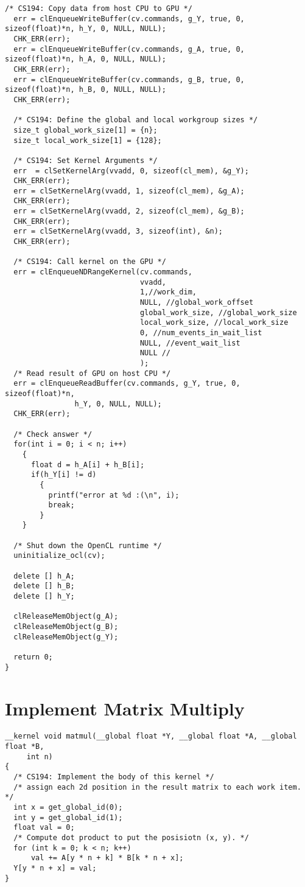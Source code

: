 \documentclass[11pt,letter]{article}
\begin{document}
\begin{lstlisting}[label=some-code,caption=vvadd.cpp]
  /* CS194: Copy data from host CPU to GPU */
  err = clEnqueueWriteBuffer(cv.commands, g_Y, true, 0, sizeof(float)*n, h_Y, 0, NULL, NULL);
  CHK_ERR(err);
  err = clEnqueueWriteBuffer(cv.commands, g_A, true, 0, sizeof(float)*n, h_A, 0, NULL, NULL);
  CHK_ERR(err);
  err = clEnqueueWriteBuffer(cv.commands, g_B, true, 0, sizeof(float)*n, h_B, 0, NULL, NULL);
  CHK_ERR(err);
 
  /* CS194: Define the global and local workgroup sizes */
  size_t global_work_size[1] = {n};
  size_t local_work_size[1] = {128};
  
  /* CS194: Set Kernel Arguments */
  err  = clSetKernelArg(vvadd, 0, sizeof(cl_mem), &g_Y);
  CHK_ERR(err);
  err = clSetKernelArg(vvadd, 1, sizeof(cl_mem), &g_A);
  CHK_ERR(err);
  err = clSetKernelArg(vvadd, 2, sizeof(cl_mem), &g_B);
  CHK_ERR(err);
  err = clSetKernelArg(vvadd, 3, sizeof(int), &n);
  CHK_ERR(err);

  /* CS194: Call kernel on the GPU */
  err = clEnqueueNDRangeKernel(cv.commands,
                               vvadd,
                               1,//work_dim,
                               NULL, //global_work_offset
                               global_work_size, //global_work_size
                               local_work_size, //local_work_size
                               0, //num_events_in_wait_list
                               NULL, //event_wait_list
                               NULL //
                               );
  /* Read result of GPU on host CPU */
  err = clEnqueueReadBuffer(cv.commands, g_Y, true, 0, sizeof(float)*n,
			    h_Y, 0, NULL, NULL);
  CHK_ERR(err);

  /* Check answer */
  for(int i = 0; i < n; i++)
    {
      float d = h_A[i] + h_B[i];
      if(h_Y[i] != d)
    	{
    	  printf("error at %d :(\n", i);
    	  break;
    	}
    }

  /* Shut down the OpenCL runtime */
  uninitialize_ocl(cv);
  
  delete [] h_A; 
  delete [] h_B; 
  delete [] h_Y;
  
  clReleaseMemObject(g_A); 
  clReleaseMemObject(g_B); 
  clReleaseMemObject(g_Y);
  
  return 0;
}
\end{lstlisting}

\section{Implement Matrix Multiply}

\begin{lstlisting}[label=some-code,caption=matmul.cl]
__kernel void matmul(__global float *Y, __global float *A, __global float *B, 
	 int n)
{
  /* CS194: Implement the body of this kernel */
  /* assign each 2d position in the result matrix to each work item. */
  int x = get_global_id(0);
  int y = get_global_id(1);
  float val = 0;
  /* Compute dot product to put the posisiotn (x, y). */
  for (int k = 0; k < n; k++) 
      val += A[y * n + k] * B[k * n + x];
  Y[y * n + x] = val;
}
\end{lstlisting}
\end{document}
